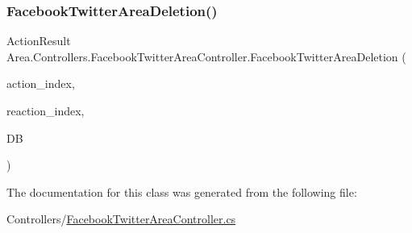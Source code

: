\mbox{\label{classArea_1_1Controllers_1_1FacebookTwitterAreaController_aaecd5ed1abd81974a4a00b6addec9a09}} 
\subsubsection{\texorpdfstring{Facebook\+Twitter\+Area\+Deletion()}{FacebookTwitterAreaDeletion()}}
{\footnotesize\ttfamily Action\+Result Area.\+Controllers.\+Facebook\+Twitter\+Area\+Controller.\+Facebook\+Twitter\+Area\+Deletion (\begin{DoxyParamCaption}\item[{string}]{action\+\_\+index,  }\item[{string}]{reaction\+\_\+index,  }\item[{\mbox{[}\+From\+Services\mbox{]} \mbox{\hyperlink{classArea_1_1DAT_1_1AreaDbContext}{Area\+Db\+Context}}}]{DB }\end{DoxyParamCaption})\hspace{0.3cm}{\ttfamily [inline]}}



The documentation for this class was generated from the following file\+:\begin{DoxyCompactItemize}
\item 
Controllers/\mbox{\hyperlink{FacebookTwitterAreaController_8cs}{Facebook\+Twitter\+Area\+Controller.\+cs}}\end{DoxyCompactItemize}
